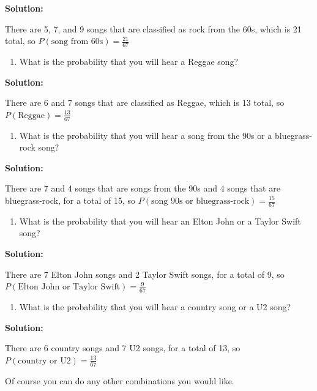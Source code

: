 \documentclass[
]{book}
\providecommand{\tightlist}{%
  \setlength{\itemsep}{0pt}\setlength{\parskip}{0pt}}
\begin{document}
\textbf{Solution:}

There are 5, 7, and 9 songs that are classified as rock from the 60s, which is 21 total, so \(P(\text{song from 60s})=\frac{21}{67}\)

\begin{enumerate}
\def\labelenumi{\alph{enumi}.}
\setcounter{enumi}{3}
\tightlist
\item
  What is the probability that you will hear a Reggae song?
\end{enumerate}

\textbf{Solution:}

There are 6 and 7 songs that are classified as Reggae, which is 13 total, so \(P(\text{Reggae})=\frac{13}{67}\)

\begin{enumerate}
\def\labelenumi{\alph{enumi}.}
\setcounter{enumi}{4}
\tightlist
\item
  What is the probability that you will hear a song from the 90s or a bluegrass-rock song?
\end{enumerate}

\textbf{Solution:}

There are 7 and 4 songs that are songs from the 90s and 4 songs that are bluegrass-rock, for a total of 15, so \(P(\text{song 90s or bluegrass-rock})=\frac{15}{67}\)

\begin{enumerate}
\def\labelenumi{\alph{enumi}.}
\setcounter{enumi}{5}
\tightlist
\item
  What is the probability that you will hear an Elton John or a Taylor Swift song?
\end{enumerate}

\textbf{Solution:}

There are 7 Elton John songs and 2 Taylor Swift songs, for a total of 9, so \(P(\text{Elton John or Taylor Swift})=\frac{9}{67}\)

\begin{enumerate}
\def\labelenumi{\alph{enumi}.}
\setcounter{enumi}{6}
\tightlist
\item
  What is the probability that you will hear a country song or a U2 song?
\end{enumerate}

\textbf{Solution:}

There are 6 country songs and 7 U2 songs, for a total of 13, so \(P(\text{country or U2})=\frac{13}{67}\)

Of course you can do any other combinations you would like.
\end{document}
